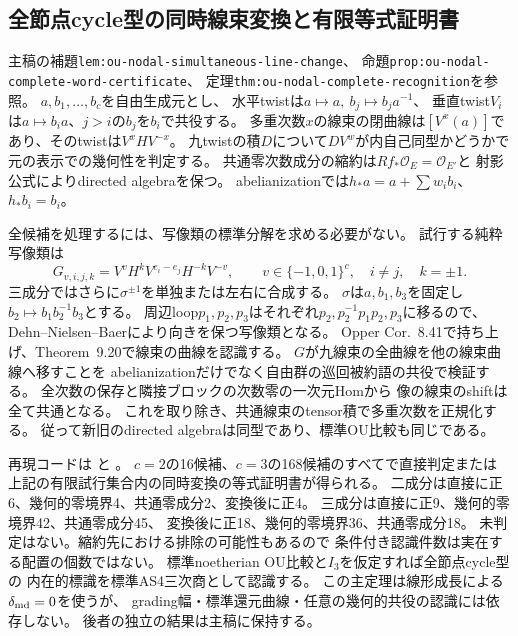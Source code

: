 \documentclass[11pt,a4paper]{ltjsarticle}
\begin{document}
\subsection*{全節点cycle型の同時線束変換と有限等式証明書}
主稿の補題\texttt{lem:ou-nodal-simultaneous-line-change}、
命題\texttt{prop:ou-nodal-complete-word-certificate}、
定理\texttt{thm:ou-nodal-complete-recognition}を参照。
$a,b_1,\ldots,b_c$を自由生成元とし、
水平twistは$a\mapsto a,\ b_j\mapsto b_j a^{-1}$、
垂直twist$V_i$は$a\mapsto b_i a$、$j>i$の$b_j$を$b_i$で共役する。
多重次数$x$の線束の閉曲線は$[V^x(a)]$であり、そのtwistは$V^x H V^{-x}$。
九twistの積$D$について$DV^w$が内自己同型かどうかで元の表示での幾何性を判定する。
共通零次数成分の縮約は$Rf_*\mathcal O_E=\mathcal O_{E'}$と
射影公式によりdirected algebraを保つ。
abelianizationでは$h_*a=a+\sum w_i b_i$、$h_*b_i=b_i$。

全候補を処理するには、写像類の標準分解を求める必要がない。
試行する純粋写像類は
\[
 G_{v,i,j,k}=V^v H^k V^{e_i-e_j}H^{-k}V^{-v},
 \qquad v\in\{-1,0,1\}^c,\quad i\ne j,\quad k=\pm1.
\]
三成分ではさらに$\sigma^{\pm1}$を単独または左右に合成する。
$\sigma$は$a,b_1,b_3$を固定し$b_2\mapsto b_1b_2^{-1}b_3$とする。
周辺loop$p_1,p_2,p_3$はそれぞれ$p_2,p_2^{-1}p_1p_2,p_3$に移るので、
Dehn--Nielsen--Baerにより向きを保つ写像類となる。
Opper Cor.~8.41で持ち上げ、Theorem~9.20で線束の曲線を認識する。
$G$が九線束の全曲線を他の線束曲線へ移すことを
abelianizationだけでなく自由群の巡回被約語の共役で検証する。
全次数の保存と隣接ブロックの次数零の一次元Homから
像の線束のshiftは全て共通となる。
これを取り除き、共通線束のtensor積で多重次数を正規化する。
従って新旧のdirected algebraは同型であり、標準OU比較も同じである。

再現コードは  と
。
$c=2$の16候補、$c=3$の168候補のすべてで直接判定または
上記の有限試行集合内の同時変換の等式証明書が得られる。
二成分は直接に正6、幾何的零境界4、共通零成分2、変換後に正4。
三成分は直接に正9、幾何的零境界42、共通零成分45、
変換後に正18、幾何的零境界36、共通零成分18。
未判定はない。縮約先における排除の可能性もあるので
条件付き認識件数は実在する配置の個数ではない。
標準noetherian OU比較と$I_3$を仮定すれば全節点cycle型の
内在的標識を標準AS4三次商として認識する。
この主定理は線形成長による$\delta_{\rm md}=0$を使うが、
grading幅・標準還元曲線・任意の幾何的共役の認識には依存しない。
後者の独立の結果は主稿に保持する。
\end{document}
